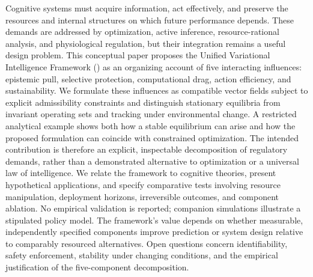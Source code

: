 Cognitive systems must acquire information, act effectively, and preserve the resources and internal structures on which future performance depends. These demands are addressed by optimization, active inference, resource-rational analysis, and physiological regulation, but their integration remains a useful design problem. This conceptual paper proposes the Unified Variational Intelligence Framework (\uvif{}) as an organizing account of five interacting influences: epistemic pull, selective protection, computational drag, action efficiency, and sustainability. We formulate these influences as compatible vector fields subject to explicit admissibility constraints and distinguish stationary equilibria from invariant operating sets and tracking under environmental change. A restricted analytical example shows both how a stable equilibrium can arise and how the proposed formulation can coincide with constrained optimization. The intended contribution is therefore an explicit, inspectable decomposition of regulatory demands, rather than a demonstrated alternative to optimization or a universal law of intelligence. We relate the framework to cognitive theories, present hypothetical applications, and specify comparative tests involving resource manipulation, deployment horizons, irreversible outcomes, and component ablation. No empirical validation is reported; companion simulations illustrate a stipulated policy model. The framework's value depends on whether measurable, independently specified components improve prediction or system design relative to comparably resourced alternatives. Open questions concern identifiability, safety enforcement, stability under changing conditions, and the empirical justification of the five-component decomposition.
